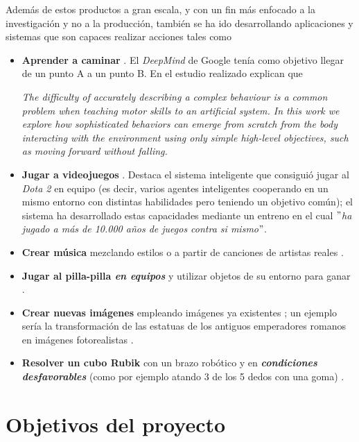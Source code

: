 Además de estos productos a gran escala, y con un fin más enfocado a la investigación y no a la producción, también se ha ido desarrollando aplicaciones y sistemas que son capaces realizar acciones tales como

\begin{itemize}
    \item \textbf{Aprender a caminar} \cite{deepmind2017AI}. El \textit{DeepMind} de Google tenía como objetivo llegar de un punto A a un punto B. En el estudio realizado \cite{deepmind2017walking} explican que
    
    \begin{displayquote}\textit{
     The difficulty of accurately describing a complex behaviour is a common problem when teaching motor skills to an artificial system. In this work we explore how sophisticated behaviors can emerge from scratch from the body interacting with the environment using only simple high-level objectives, such as moving forward without falling.}
    \end{displayquote}
    \item \textbf{Jugar a videojuegos }\cite{medium2019NNVideoGames, openai2019five, berner2019dota}. Destaca el sistema inteligente que consiguió jugar al \textit{Dota 2} en equipo (es decir, varios agentes inteligentes cooperando en un mismo entorno con distintas habilidades pero teniendo un objetivo común); el sistema ha desarrollado estas capacidades mediante un entreno en el cual \textit{$"$ha jugado a más de 10.000 años de juegos contra si mismo$"$}.
    \item \textbf{Crear música} mezclando estilos o a partir de canciones de artistas reales \cite{jukebox2020openai}.
    \item \textbf{Jugar al pilla-pilla \textit{en equipos}} y utilizar objetos de su entorno para ganar \cite{openAI2019MARL}.
    \item \textbf{Crear nuevas imágenes} empleando imágenes ya existentes \cite{artbreeder}; un ejemplo sería la transformación de las estatuas de los antiguos emperadores romanos en imágenes fotorealistas \cite{theverge2020artbreeder}.
    \item \textbf{Resolver un cubo Rubik} con un brazo robótico y en \textbf{\textit{condiciones desfavorables}} (como por ejemplo atando 3 de los 5 dedos con una goma) \cite{rubik2019openai}.
\end{itemize}

\section{Objetivos del proyecto}

